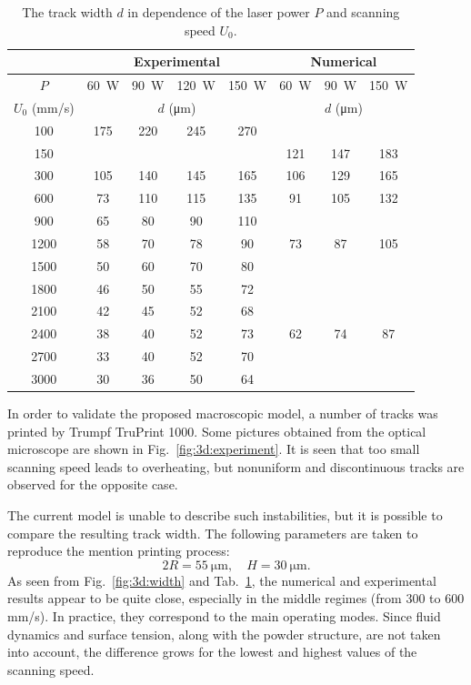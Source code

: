 \documentclass{article}
\begin{document}
\begin{table}
    \centering
    \caption{
        The track width \(d\) in dependence of the laser power \(P\) and scanning speed \(U_0\).
    }\label{table:3d:width}
    \centering
    \begin{tabular}{|c|cccc|ccc|}\hline
        & \multicolumn{4}{c|}{Experimental} & \multicolumn{3}{c|}{Numerical} \\\hline
        \(P\) & \SI{60}{W} & \SI{90}{W} & \SI{120}{W} & \SI{150}{W} & \SI{60}{W} & \SI{90}{W} & \SI{150}{W} \\\hline
        \(U_0\) (\si{mm/s}) & \multicolumn{4}{c|}{\(d\) (\si{\um})} & \multicolumn{3}{c|}{\(d\) (\si{\um})} \\\hline
        100  & 175 & 220 & 245 & 270 &     &     &     \\
        150  &     &     &     &     & 121 & 147 & 183 \\
        300  & 105 & 140 & 145 & 165 & 106 & 129 & 165 \\
        600  & 73  & 110 & 115 & 135 & 91  & 105 & 132 \\
        900  & 65  & 80  & 90  & 110 &     &     &     \\
        1200 & 58  & 70  & 78  & 90  & 73  & 87  & 105 \\
        1500 & 50  & 60  & 70  & 80  &     &     &     \\
        1800 & 46  & 50  & 55  & 72  &     &     &     \\
        2100 & 42  & 45  & 52  & 68  &     &     &     \\
        2400 & 38  & 40  & 52  & 73  & 62  & 74  & 87  \\
        2700 & 33  & 40  & 52  & 70  &     &     &     \\
        3000 & 30  & 36  & 50  & 64  &     &     &     \\\hline
    \end{tabular}
\end{table}

In order to validate the proposed macroscopic model, a number of tracks was printed by Trumpf TruPrint 1000.
Some pictures obtained from the optical microscope are shown in Fig.~\ref{fig:3d:experiment}.
It is seen that too small scanning speed leads to overheating,
but nonuniform and discontinuous tracks are observed for the opposite case.

The current model is unable to describe such instabilities,
but it is possible to compare the resulting track width.
The following parameters are taken to reproduce the mention printing process:
\begin{equation}\label{eq:single:trumpf}
    2R=\SI{55}{\um}, \quad H=\SI{30}{\um}.
\end{equation}
As seen from Fig.~\ref{fig:3d:width} and Tab.~\ref{table:3d:width},
the numerical and experimental results appear to be quite close, especially in the middle regimes (from 300 to 600 \si{mm/s}).
In practice, they correspond to the main operating modes.
Since fluid dynamics and surface tension, along with the powder structure, are not taken into account,
the difference grows for the lowest and highest values of the scanning speed.

\printbibliography
\end{document}
